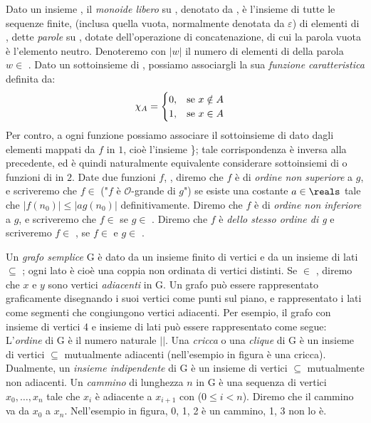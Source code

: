 Dato un insieme , il \textit{monoide libero} su , denotato da , è l'insieme di tutte le sequenze finite, (inclusa quella vuota, normalmente denotata da $\varepsilon$) di elementi di , dette \textit{parole} su , dotate dell'operazione di concatenazione, di cui la parola vuota è l'elemento neutro. Denoteremo con $|w|$ il numero di elementi di  della parola $w \in$ .
Dato un sottoinsieme  di , possiamo associargli la sua \textit{funzione caratteristica}  definita da:
\begin{equation}
    \chi_A =
    \begin{cases}
        0, \hspace{3mm} \textnormal{se } x \notin A \\
        1, \hspace{3mm} \textnormal{se } x \in A \\
    \end{cases}
\end{equation}
Per contro, a ogni funzione  possiamo associare il sottoinsieme di  dato dagli elementi mappati da $f$ in $1$, cioè l'insieme \}; tale corrispondenza è inversa alla precedente, ed è quindi naturalmente equivalente considerare sottoinsiemi di  o funzioni di  in $2$.
Date due funzioni $f$, , diremo che $f$ è di \textit{ordine non superiore} a $g$, e scriveremo che $f \in$  ("$f$ è $\mathcal{O}$-grande di $g$") se esiste una costante $a \in \reals$ tale che $|f(n_0)| \leq |a g(n_0)|$ definitivamente. Diremo che $f$ è di \textit{ordine non inferiore} a $g$, e scriveremo che $f \in$  se $g \in$ . Diremo che $f$ è \textit{dello stesso ordine di g} e scriveremo $f \in$ , se $f \in$  e $g \in$ .

Un \textit{grafo semplice} G è dato da un insieme finito di vertici  e da un insieme di lati  $\subseteq$ ; ogni lato è cioè una coppia non ordinata di vertici distinti. Se  $\in$ , diremo che $x$ e $y$ sono vertici \textit{adiacenti} in G. Un grafo può essere rappresentato graficamente disegnando i suoi vertici come punti sul piano, e rappresentato i lati come segmenti che congiungono vertici adiacenti. Per esempio, il grafo con insieme di vertici 4 e insieme di lati   può essere rappresentato come segue:
L'\textit{ordine} di G è il numero naturale $|$$|$. Una \textit{cricca} o una \textit{clique} di G è un insieme di vertici  $\subseteq$  mutualmente adiacenti (nell'esempio in figura  è una cricca). Dualmente, un \textit{insieme indipendente} di G è un insieme di vertici  $\subseteq$  mutualmente non adiacenti. Un \textit{cammino} di lunghezza $n$ in G è una sequenza di vertici $x_0, \dots, x_{n}$ tale che $x_i$ è adiacente a $x_{i + 1}$ con ($0 \leq i < n$). Diremo che il cammino va da $x_0$ a $x_{n}$. Nell'esempio in figura, 0, 1, 2 è un cammino, 1, 3 non lo è.


